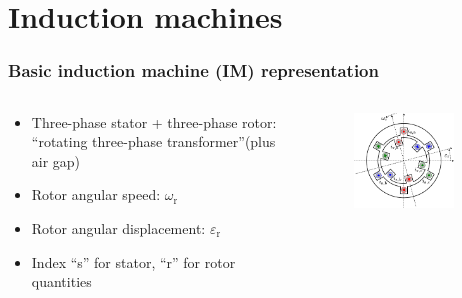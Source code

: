 \section{Induction machines}


\begin{frame}
	\frametitle{Basic induction machine (IM) representation}
    \begin{columns}
		\begin{column}{0.55\textwidth}
	       \begin{itemize}
            \item Three-phase stator + three-phase rotor: ``rotating three-phase transformer''\newline (plus air gap)
            \item Rotor angular speed: $\omega_\mathrm{r}$
            \item Rotor angular displacement: $\varepsilon_\mathrm{r}$
            \item Index ``s'' for stator, ``r'' for rotor quantities
           \end{itemize}
        \end{column}
        \begin{column}{0.45\textwidth}
            \begin{figure}
                \centering
                \includegraphics[width=0.85\textwidth]{fig/lec06/Simple_three_phase_induction_machine_lumped_coils.pdf}

\end{figure}
\end{column}
\end{columns}
\end{frame}
